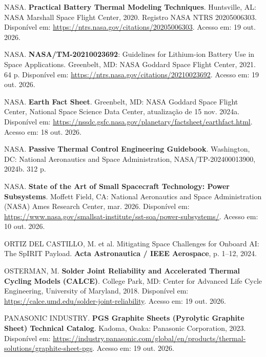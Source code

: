 \vspace{0.2cm}
\noindent NASA. \textbf{Practical Battery Thermal Modeling Techniques}. Huntsville, AL: NASA Marshall Space Flight Center, 2020. Registro NASA NTRS 20205006303. Disponível em: \url{https://ntrs.nasa.gov/citations/20205006303}. Acesso em: 19 out. 2026.

\vspace{0.2cm}
\noindent NASA. \textbf{NASA/TM-20210023692}: Guidelines for Lithium-ion Battery Use in Space Applications. Greenbelt, MD: NASA Goddard Space Flight Center, 2021. 64 p. Disponível em: \url{https://ntrs.nasa.gov/citations/20210023692}. Acesso em: 19 out. 2026.

\vspace{0.2cm}
\noindent NASA. \textbf{Earth Fact Sheet}. Greenbelt, MD: NASA Goddard Space Flight Center, National Space Science Data Center, atualização de 15 nov. 2024a. Disponível em: \url{https://nssdc.gsfc.nasa.gov/planetary/factsheet/earthfact.html}. Acesso em: 18 out. 2026.

\vspace{0.2cm}
\noindent NASA. \textbf{Passive Thermal Control Engineering Guidebook}. Washington, DC: National Aeronautics and Space Administration, NASA/TP-202400013900, 2024b. 312 p.

\vspace{0.2cm}
\noindent NASA. \textbf{State of the Art of Small Spacecraft Technology: Power Subsystems}. Moffett Field, CA: National Aeronautics and Space Administration (NASA) Ames Research Center, mar. 2026. Disponível em: \url{https://www.nasa.gov/smallsat-institute/sst-soa/power-subsystems/}. Acesso em: 10 out. 2026.

\vspace{0.2cm}
\noindent ORTIZ DEL CASTILLO, M. et al. Mitigating Space Challenges for Onboard AI: The SpIRIT Payload. \textbf{Acta Astronautica / IEEE Aerospace}, p. 1--12, 2024.

\vspace{0.2cm}
\noindent OSTERMAN, M. \textbf{Solder Joint Reliability and Accelerated Thermal Cycling Models (CALCE)}. College Park, MD: Center for Advanced Life Cycle Engineering, University of Maryland, 2018. Disponível em: \url{https://calce.umd.edu/solder-joint-reliability}. Acesso em: 19 out. 2026.

\vspace{0.2cm}
\noindent PANASONIC INDUSTRY. \textbf{PGS Graphite Sheets (Pyrolytic Graphite Sheet) Technical Catalog}. Kadoma, Osaka: Panasonic Corporation, 2023. Disponível em: \url{https://industry.panasonic.com/global/en/products/thermal-solutions/graphite-sheet-pgs}. Acesso em: 19 out. 2026.

